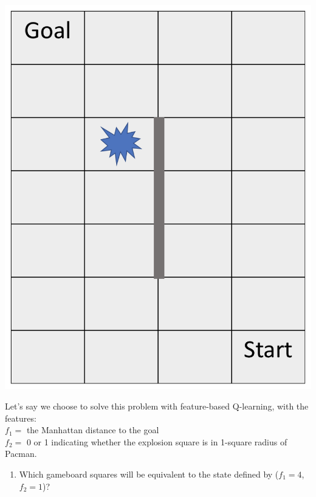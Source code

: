 \documentclass[a4paper]{article}
\newif\ifsol
\begin{document}
\begin{enumerate}
    \begin{center}
    \includegraphics[scale=0.25]{grid.png}
    \end{center}
    
    Let's say we choose to solve this problem with feature-based Q-learning, with the features: \\
    $f_1 =$ the Manhattan distance to the goal \\
    $f_2 =$ 0 or 1 indicating whether the explosion square is in 1-square radius of Pacman.
    \begin{enumerate}
        \item Which gameboard squares will be equivalent to the state defined by ($f_1 = 4$, $f_2 = 1$)? \\
        \ifsol
            \textcolor{blue}{Squares (1, 3) and (2, 4) both have a Manhattan distance of $4$ to the goal, and are one square away from the square $(1, 4)$.}
        \else
            \vspace{5em}
        \fi
        

\end{enumerate}
\end{enumerate}
\end{document}
